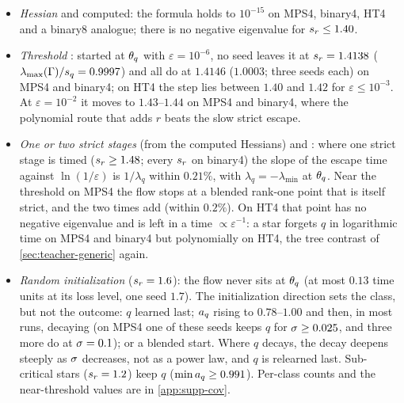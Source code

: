\begin{itemize}
  \item \emph{Hessian} \proven{} and computed: the formula holds to $10^{-15}$ on MPS4, binary4, HT4 and a
    binary8 analogue; there is no negative eigenvalue for $s_{r}\le1.40$.
  \item \emph{Threshold} \empirical{} \newresult[dynamics]: started at $\theta_q$ with $\varepsilon=10^{-6}$, no seed leaves
    it at $s_{r}=1.4138$ ($\lambda_{\max}(\Gamma)/s_{q}=0.9997$) and all do at $1.4146$ ($1.0003$; three seeds each) on
    MPS4 and binary4; on HT4 the step lies between $1.40$ and $1.42$ for $\varepsilon\le10^{-3}$. At $\varepsilon=10^{-2}$ it
    moves to $1.43$--$1.44$ on MPS4 and binary4, where the polynomial route that adds $r$ beats the slow strict
    escape.
  \item \emph{One or two strict stages} \derived{} (from the computed Hessians) and \empirical{} \newresult:
    where one strict stage is timed ($s_{r}\ge1.48$; every $s_{r}$ on binary4) the slope of the escape time
    against $\ln(1/\varepsilon)$ is $1/\lambda_q$ within $0.21\%$, with $\lambda_q=-\lambda_{\min}$ at $\theta_q$. Near the threshold
    on MPS4 the flow stops at a blended rank-one point that is itself strict, and the two times add (within
    $0.2\%$). On HT4 that point has no negative eigenvalue and is left in a time $\propto\varepsilon^{-1}$: a star
    forgets $q$ in logarithmic time on MPS4 and binary4 but polynomially on HT4, the tree contrast of
    \cref{sec:teacher-generic} again.
  \item \emph{Random initialization} \empirical{} \newresult{} ($s_{r}=1.6$): the flow never sits at $\theta_q$
    (at most $0.13$ time units at its loss level, one seed $1.7$). The initialization direction sets the
    class, but not the outcome: $q$ learned last; $a_{q}$ rising to $0.78$--$1.00$ and then, in most runs,
    decaying (on MPS4 one of these seeds keeps $q$ for $\sigma\ge0.025$, and three more do at $\sigma=0.1$); or a
    blended start.
    Where $q$ decays, the decay deepens steeply as $\sigma$ decreases, not as a power law, and $q$ is relearned
    last. Sub-critical stars ($s_{r}=1.2$) keep $q$ ($\min a_{q}\ge0.991$). Per-class counts and the near-threshold
    values are in \cref{app:supp-cov}.
\end{itemize}

